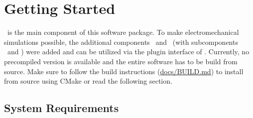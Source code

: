 \section{Getting Started}
\label{sec:gettingstrated}

\CM~is the main component of this software package.
To make electromechanical simulations possible, the additional components \ACC~and \CMT~(with subcomponents \EMT~and \FMT) were added and can be utilized via the plugin interface of \CM.
Currently, no precompiled version is available and the entire software has to be build from source.
Make sure to follow the build instructions  (\href{https://github.com/KIT-IBT/CardioMechanics/blob/main/docs/BUILD.md}{docs/BUILD.md}) to install from source using CMake or read the following section.

\subsection{System Requirements}

